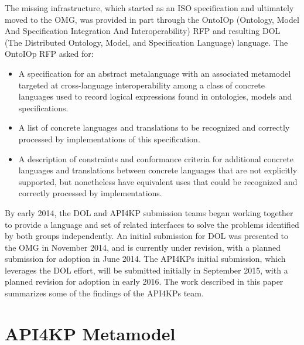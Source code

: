\documentclass[runningheads]{llncs}
\begin{document}
The missing infrastructure, which started as an ISO specification and ultimately moved to the OMG, was provided in part through the OntoIOp (Ontology, Model And Specification Integration And Interoperability) RFP \cite{OntoIOp} and resulting DOL (The Distributed Ontology,
Model, and Specification
Language) language. The OntoIOp RFP asked for:
\begin {itemize}
\item A specification for an abstract metalanguage with an associated metamodel targeted at cross-language interoperability among a class of concrete languages used to record logical expressions found in ontologies, models and specifications.
\item A list of concrete languages and translations to be recognized and correctly processed by implementations of this specification. 
\item A description of constraints and conformance criteria for additional concrete languages and translations between concrete languages that are not explicitly supported, but nonetheless have equivalent uses that could be recognized and correctly processed by implementations.
\end{itemize}

By early 2014, the DOL and API4KP submission teams began working together to provide a language and set of related interfaces to solve the problems identified by both groups independently. An initial submission for DOL \cite{DOL} was presented to the OMG in November 2014, and is currently under revision, with a planned submission for adoption in June 2014.  The API4KPs initial submission, which leverages the DOL effort, will be submitted initially in September 2015, with a planned revision for adoption in early 2016.  The work described in this paper summarizes some of the findings of the API4KPs team.




\section{API4KP Metamodel}
\label{sec:metamodel}
\end{document}
